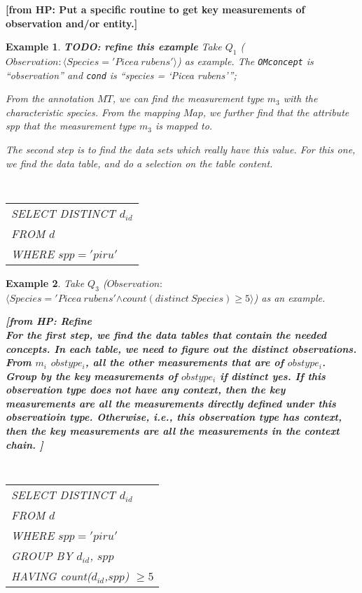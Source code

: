 \documentclass[conference]{IEEEtran}
\newtheorem{example}{\bf Example}[section]
\newcommand{\from}[2]{{\bf[{\sc from #1:} #2]}}
\begin{document}
\from{HP}{Put a specific routine to get key measurements of
  observation and/or entity.}


\begin{example}\label{eg:query_reqerite_q1}
{\bf TODO: refine this example} 
Take $Q_1$ ($Observation: \langle Species='Picea~rubens'\rangle$) as
example. 
The {\tt OMconcept} is ``observation'' and {\tt cond} is ``{\em species = `Picea rubens'}''; 

From the annotation $MT$, we can find the measurement type
$m_3$ with the characteristic {\em species}. 
From the mapping $Map$, we further find that the attribute {\em spp} that the
measurement type $m_3$ is mapped to. 

The second step is to find the data sets which really have this value. 
For this one, we find the data table, and do a selection on the table
content. 

\vspace{0.1in}
{\tt 
\begin{tabular}{l} 
SELECT DISTINCT $d_{id}$\\
FROM $d$\\
WHERE $spp = 'piru'$
\end{tabular}
}
\vspace{0.1in}

\end{example}

\begin{example}
Take $Q_3$ ($Observation:$\\
$\langle Species='Picea~rubens'$$\wedge count(distinct~Species)\geq
5\rangle$) as an example. 

\from{HP}{Refine\\
For the first step, we find the data tables that contain the needed concepts. 
In each table, we need to figure out the distinct observations. 
From $m_i$ $obstype_i$, all the other measurements that are of
$obstype_i$. 
Group by the key measurements of $obstype_i$ if distinct yes.
If this observation type does not have any context, then the key
measurements are all the measurements directly defined under this
observatioin type. Otherwise, i.e., this observation type has context,
then the key measurements are all the measurements in the context
chain. }

\vspace{0.1in}
{\tt 
\begin{tabular}{l} 
SELECT DISTINCT $d_{id}$\\
FROM $d$\\
WHERE $spp = 'piru'$\\
GROUP BY $d_{id}$, $spp$\\
HAVING count($d_{id}$,$spp$) $\geq 5$\\
\end{tabular}
}
\vspace{0.1in}

\end{example}
\end{document}
